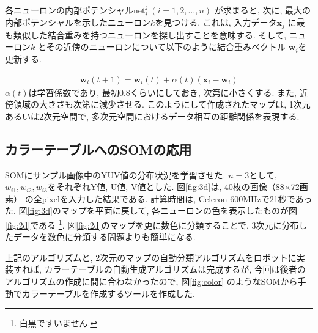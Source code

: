 \documentclass[a4paper,11pt]{jarticle}
\begin{document}
各ニューロンの内部ポテンシャル$\text{net}_i^j \ (i=1,2,\ldots ,n)$
が求まると, 次に, 最大の内部ポテンシャルを示したニューロン$k$を見つける. 
これは, 入力データ$\boldsymbol{x}_j$
に最も類似した結合重みを持つニューロンを探し出すことを意味する. 
そして, ニューロン$k$
とその近傍のニューロンについて以下のように結合重みベクトル
$\boldsymbol{w}_i$を更新する. 

\begin{eqnarray}
\boldsymbol{w}_i(t+1) = \boldsymbol{w}_i(t) + \alpha(t)(\boldsymbol{x}_i - \boldsymbol{w}_i)
\end{eqnarray}
$\alpha(t)$は学習係数であり, 最初0.8くらいにしておき, 次第に小さくする. 
また, 近傍領域の大きさも次第に減少させる. 
このようにして作成されたマップは, 1次元あるいは2次元空間で,
多次元空間におけるデータ相互の距離関係を表現する. 


\subsection{カラーテーブルへのSOMの応用}
SOMにサンプル画像中のYUV値の分布状況を学習させた. 
$n=3$として, $w_{i1},w_{i2},w_{i3}$をそれぞれY値, U値, V値とした. 
図\ref{fig:3d}は, 40枚の画像（88$\times$72画素）
の全pixelを入力した結果である. 
計算時間は, Celeron 600MHzで21秒であった. 
図\ref{fig:3d}のマップを平面に戻して,
各ニューロンの色を表示したものが図\ref{fig:2d}である
\footnote{白黒ですいません. }. 
図\ref{fig:2d}のマップを更に数色に分類することで,
3次元に分布したデータを数色に分類する問題よりも簡単になる. 


上記のアルゴリズムと,
2次元のマップの自動分類アルゴリズムをロボットに実装すれば,
カラーテーブルの自動生成アルゴリズムは完成するが,
今回は後者のアルゴリズムの作成に間に合わなかったので,
図\ref{fig:color}
のようなSOMから手動でカラーテーブルを作成するツールを作成した. 
\end{document}

